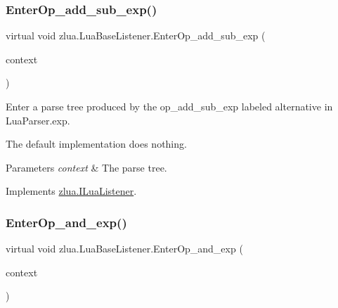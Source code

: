 \subsubsection{\texorpdfstring{Enter\+Op\+\_\+add\+\_\+sub\+\_\+exp()}{EnterOp\_add\_sub\_exp()}}
{\footnotesize\ttfamily virtual void zlua.\+Lua\+Base\+Listener.\+Enter\+Op\+\_\+add\+\_\+sub\+\_\+exp (\begin{DoxyParamCaption}\item[{\mbox{[}\+Not\+Null\mbox{]} \mbox{\hyperlink{classzlua_1_1_lua_parser_1_1_op__add__sub__exp_context}{Lua\+Parser.\+Op\+\_\+add\+\_\+sub\+\_\+exp\+Context}}}]{context }\end{DoxyParamCaption})\hspace{0.3cm}{\ttfamily [virtual]}}



Enter a parse tree produced by the {\ttfamily op\+\_\+add\+\_\+sub\+\_\+exp} labeled alternative in Lua\+Parser.\+exp. 

The default implementation does nothing.


\begin{DoxyParams}{Parameters}
{\em context} & The parse tree.\\
\hline
\end{DoxyParams}


Implements \mbox{\hyperlink{interfacezlua_1_1_i_lua_listener_a1633c1d8de4e31ea48b020df3c5dba75}{zlua.\+I\+Lua\+Listener}}.

\mbox{\label{classzlua_1_1_lua_base_listener_ace41c3066a31697b1bda64251528030b}} 
\subsubsection{\texorpdfstring{Enter\+Op\+\_\+and\+\_\+exp()}{EnterOp\_and\_exp()}}
{\footnotesize\ttfamily virtual void zlua.\+Lua\+Base\+Listener.\+Enter\+Op\+\_\+and\+\_\+exp (\begin{DoxyParamCaption}\item[{\mbox{[}\+Not\+Null\mbox{]} \mbox{\hyperlink{classzlua_1_1_lua_parser_1_1_op__and__exp_context}{Lua\+Parser.\+Op\+\_\+and\+\_\+exp\+Context}}}]{context }\end{DoxyParamCaption})\hspace{0.3cm}{\ttfamily [virtual]}}



